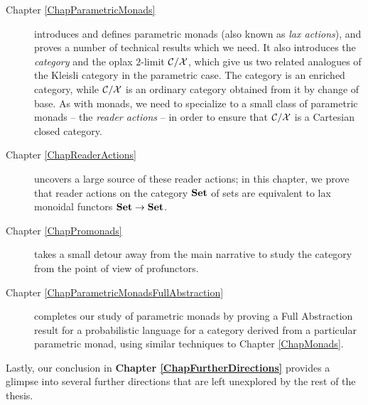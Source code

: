 \begin{description}
  \item[Chapter \ref{ChapParametricMonads}] introduces and defines parametric monads (also known as \emph{lax actions}), and proves a number of technical results which we need.
    It also introduces the \emph{\Mellies category} and the oplax $2$-limit ${\mathcal{C}}/\mathcal X$, which give us two related analogues of the Kleisli category in the parametric case.
    The \Mellies category is an enriched category, while ${\mathcal{C}}/\mathcal X$ is an ordinary category obtained from it by change of base.
    As with monads, we need to specialize to a small class of parametric monads -- the \emph{reader actions} -- in order to ensure that ${\mathcal{C}}/\mathcal X$ is a Cartesian closed category.
  \item[Chapter \ref{ChapReaderActions}] uncovers a large source of these reader actions; in this chapter, we prove that reader actions on the category ${\normalfont\textbf{Set}}$ of sets are equivalent to lax monoidal functors ${\normalfont\textbf{Set}} \to {\normalfont\textbf{Set}}$.
  \item[Chapter \ref{ChapPromonads}] takes a small detour away from the main narrative to study the \Mellies category from the point of view of profunctors.
  \item[Chapter \ref{ChapParametricMonadsFullAbstraction}] completes our study of parametric monads by proving a Full Abstraction result for a probabilistic language for a category derived from a particular parametric monad, using similar techniques to Chapter \ref{ChapMonads}.
\end{description}
Lastly, our conclusion in {\bf Chapter \ref{ChapFurtherDirections}} provides a glimpse into several further directions that are left unexplored by the rest of the thesis.
